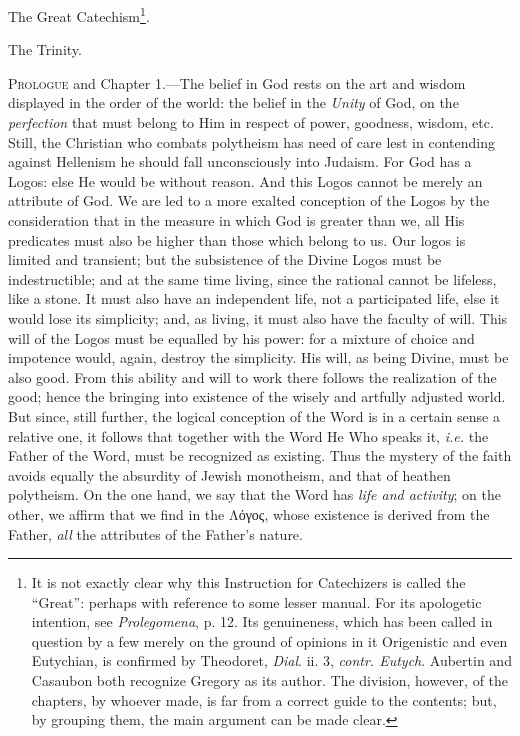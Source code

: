 
The Great Catechism\footnote{It is not exactly clear why this Instruction for Catechizers is called the “Great”: perhaps with reference to some lesser manual. For its apologetic intention, see \emph{Prolegomena}, p. 12. Its genuineness, which has been called in question by a few merely on the ground of opinions in it Origenistic and even Eutychian, is confirmed by Theodoret, \emph{Dial}. ii. 3, \emph{contr. Eutych}. Aubertin and Casaubon both recognize Gregory as its author. The division, however, of the chapters, by whoever made, is far from a correct guide to the contents; but, by grouping them, the main argument can be made clear.}.

The Trinity.

\textsc{Prologue} and Chapter 1.—The belief in God rests on the art and wisdom displayed in the order of the world: the belief in the \emph{Unity} of God, on the \emph{perfection} that must belong to Him in respect of power, goodness, wisdom, etc. Still, the Christian who combats polytheism has need of care lest in contending against Hellenism he should fall unconsciously into Judaism. For God has a Logos: else He would be without reason. And this Logos cannot be merely an attribute of God. We are led to a more exalted conception of the Logos by the consideration that in the measure in which God is greater than we, all His predicates must also be higher than those which belong to us. Our logos is limited and transient; but the subsistence of the Divine Logos must be indestructible; and at the same time living, since the rational cannot be lifeless, like a stone. It must also have an independent life, not a participated life, else it would lose its simplicity; and, as living, it must also have the faculty of will. This will of the Logos must be equalled by his power: for a mixture of choice and impotence would, again, destroy the simplicity. His will, as being Divine, must be also good. From this ability and will to work there follows the realization of the good; hence the bringing into existence of the wisely and artfully adjusted world. But since, still further, the logical conception of the Word is in a certain sense a relative one, it follows that together with the Word He Who speaks it, \emph{i.e.} the Father of the Word, must be recognized as existing. Thus the mystery of the faith avoids equally the absurdity of Jewish monotheism, and that of heathen polytheism. On the one hand, we say that the Word has \emph{life and activity}; on the other, we affirm that we find in the \textgreek{Λόγος}, whose existence is derived from the Father, \emph{all} the attributes of the Father’s nature.

